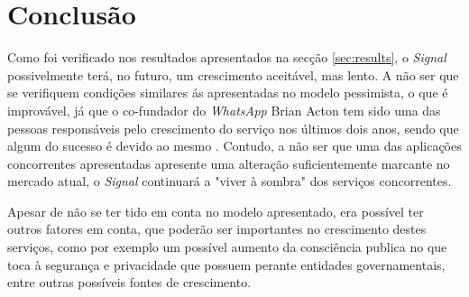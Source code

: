 \section{Conclusão}

Como foi verificado nos resultados apresentados na secção \ref{sec:results}, o \textit{Signal} possivelmente terá, no futuro, um crescimento aceitável, mas lento. A não ser que se verifiquem condições similares ás apresentadas no modelo pessimista, o que é improvável, já que o co-fundador do \textit{WhatsApp} Brian Acton tem sido uma das pessoas responsáveis pelo crescimento do serviço nos últimos dois anos, sendo que algum do sucesso é devido ao mesmo \cite{wired_signal}. Contudo, a não ser que uma das aplicações concorrentes apresentadas apresente uma alteração suficientemente marcante no mercado atual, o \textit{Signal} continuará a "viver à sombra" dos serviços concorrentes.

Apesar de não se ter tido em conta no modelo apresentado, era possível ter outros fatores em conta, que poderão ser importantes no crescimento destes serviços, como por exemplo um possível aumento da consciência publica no que toca à segurança e privacidade que possuem perante entidades governamentais, entre outras possíveis fontes de crescimento.
